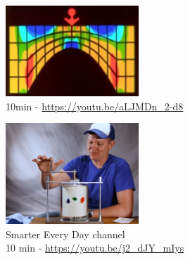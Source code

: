 
\begin{center}
\includegraphics[width=5cm]{images/youtube/superold}\\
10min - \url{https://youtu.be/aLJMDn_2-d8}
\end{center}

\begin{center}
\includegraphics[width=5cm]{images/youtube/smarter}\\
Smarter Every Day channel\\
10 min - \url{https://youtu.be/j2_dJY_mIys}
\end{center}
